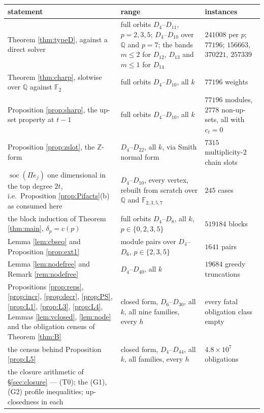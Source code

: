\documentclass[reqno]{amsart}
\theoremstyle{plain}
\theoremstyle{definition}
\DeclareMathOperator{\soc}{soc}
\newcommand{\Pia}{\Pi}
\begin{document}
\begin{center}
\renewcommand{\arraystretch}{1.2}
\begin{tabular}{p{}p{}p{}}
\hline
statement & range & instances\\
\hline
Theorem \ref{thm:typeD}, against a direct solver &
 full orbits $D_4$--$D_{11}$, $p=2,3,5$; $D_4$--$D_{10}$ over $\mathbb{Q}$ and
 $p=7$; the bands $m\le2$ for $D_{12}$, $D_{13}$ and $m\le1$ for $D_{14}$ &
 $241008$ per $p$; $77196$; $156663$, $370221$, $257339$\\
Theorem \ref{thm:charp}, slotwise over $\mathbb{Q}$ against $\mathbb{F}_2$ &
 full orbits $D_4$--$D_{10}$, all $k$ & $77196$ weights\\
Proposition \ref{prop:sharp}, the up-set property at $t-1$ &
 full orbits $D_4$--$D_{10}$, all $k$ & $77196$ modules, $2778$ non-up-sets,
 all with $c_t=0$\\
Proposition \ref{prop:zslot}, the $\mathbb{Z}$-form &
 $D_4$--$D_{22}$, all $k$, via Smith normal form & $7315$ multiplicity-$2$
 chain slots\\
$\soc(\Pia e_j)$ one dimensional in the top degree $2t$, i.e.\ Proposition
 \ref{prop:Pifacts}\textup{(b)} as consumed here &
 $D_4$--$D_{10}$, every vertex, rebuilt from scratch over $\mathbb{Q}$ and
 $\mathbb{F}_{2,3,5,7}$ & $245$ cases\\
the block induction of Theorem \ref{thm:main}, $\delta_p=c(p)$ &
 full orbits $D_4$--$D_8$, all $k$, $p\in\{0,2,3,5\}$ & $519184$ blocks\\
Lemma \ref{lem:cbseq} and Proposition \ref{prop:ext1} &
 module pairs over $D_4$--$D_6$, $p\in\{2,3,5\}$ & $1641$ pairs\\
Lemma \ref{lem:nodefree} and Remark \ref{rem:nodefree} &
 $D_4$--$D_{40}$, all $k$ & $19684$ greedy truncations\\
Propositions \ref{prop:reps}, \ref{prop:incr}, \ref{prop:decr}, \ref{prop:PS},
 \ref{prop:L1}, \ref{prop:L3}, \ref{prop:L4}, Lemmas \ref{lem:vclosed},
 \ref{lem:node} and the obligation census of Theorem \ref{thm:B} &
 closed form, $D_6$--$D_{30}$, all $k$, all nine families, every $h$ &
 every fatal obligation class empty\\
the census behind Proposition \ref{prop:L5} &
 closed form, $D_4$--$D_{44}$, all $k$, all families, every $h$ &
 $4.8\times10^{7}$ obligations\\
the closure arithmetic of \S\ref{sec:closure} --- \textup{(T0)}; the
 \textup{(G1)}, \textup{(G2)} profile inequalities; up-closedness in each

\end{tabular}
\end{center}
\end{document}
